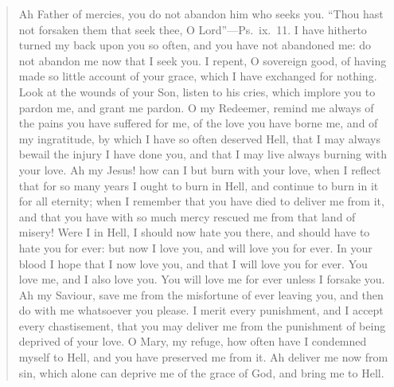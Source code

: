 \begin{quote}
Ah Father of mercies, you do not abandon him who seeks you. ``Thou hast not forsaken them that seek thee, O Lord''---Ps.\ ix.\ 11. I have hitherto turned my back upon you so often, and you have not abandoned me: do not abandon me now that I seek you. I repent, O sovereign good, of having made so little account of your grace, which I have exchanged for nothing. Look at the wounds of your Son, listen to his cries, which implore you to pardon me, and grant me pardon. O my Redeemer, remind me always of the pains you have suffered for me, of the love you have borne me, and of my ingratitude, by which I have so often deserved Hell, that I may always bewail the injury I have done you, and that I may live always burning with your love. Ah my Jesus! how can I but burn with your love, when I reflect that for so many years I ought to burn in Hell, and continue to burn in it for all eternity; when I remember that you have died to deliver me from it, and that you have with so much mercy rescued me from that land of misery! Were I in Hell, I should now hate you there, and should have to hate you for ever: but now I love you, and will love you for ever. In your blood I hope that I now love you, and that I will love you for ever. You love me, and I also love you. You will love me for ever unless I forsake you. Ah my Saviour, save me from the misfortune of ever leaving you, and then do with me whatsoever you please. I merit every punishment, and I accept every chastisement, that you may deliver me from the punishment of being deprived of your love. O Mary, my refuge, how often have I condemned myself to Hell, and you have preserved me from it. Ah deliver me now from sin, which alone can deprive me of the grace of God, and bring me to Hell.
\end{quote}
